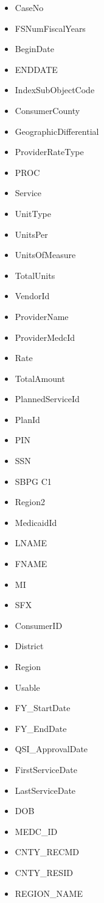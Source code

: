 \documentclass[12pt, letterpaper]{article}
\begin{document}
\begin{itemize}
\noindent \textbf{Other Items Not included (i.e., not called explicitly)}\\
	\item CaseNo
	\item FSNumFiscalYears
	\item BeginDate
	\item ENDDATE
	\item IndexSubObjectCode
	\item ConsumerCounty
	\item GeographicDifferential
	\item ProviderRateType
	\item PROC
	\item Service
	\item UnitType
	\item UnitsPer
	\item UnitsOfMeasure
	\item TotalUnits
	\item VendorId
	\item ProviderName
	\item ProviderMedcId
	\item Rate
	\item TotalAmount
	\item PlannedServiceId
	\item PlanId
	\item PIN
	\item SSN
	\item SBPG C1
	\item Region2
	\item MedicaidId
	\item LNAME
	\item FNAME
	\item MI
	\item SFX
	\item ConsumerID
	\item District
	\item Region
	\item Usable
	\item FY_StartDate
	\item FY_EndDate
	\item QSI_ApprovalDate
	\item FirstServiceDate
	\item LastServiceDate
	\item DOB
	\item MEDC_ID
	\item CNTY_RECMD
	\item CNTY_RESID
	\item REGION_NAME

\end{itemize}
\end{document}
